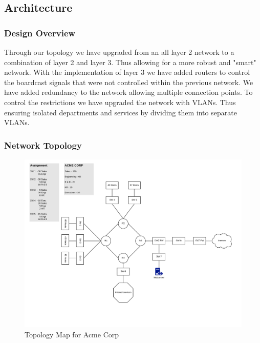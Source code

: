 \subsection{Architecture}
\subsubsection{Design Overview}
Through our topology we have upgraded from an all layer 2 network to a combination of layer 2 and layer 3. 
Thus allowing for a more robust and "smart" network. With the implementation of layer 3 we have added routers to 
control the boardcast signals that were not controlled within the previous network. We have added redundancy to the
network allowing multiple connection points. To control the restrictions we have upgraded the network with VLANs. Thus ensuring
isolated departments and services by dividing them into separate VLANs. 
 
\subsubsection{Network Topology}
\begin{figure}[!htb]
	\includegraphics[width=\textwidth]{images/networktopology.png}
	\caption{Topology Map for Acme Corp}
\end{figure}
